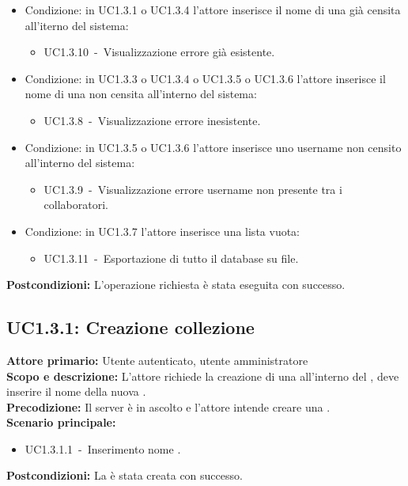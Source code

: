 \documentclass{scalatekids-article}
\begin{document}
\begin{itemize}
\item Condizione: in UC1.3.1 o UC1.3.4 l'attore inserisce il nome di una  già censita all'iterno del sistema:
  \begin{itemize}
  \item UC1.3.10\ -\ Visualizzazione errore  già esistente.
  \end{itemize}
\item Condizione: in UC1.3.3 o UC1.3.4 o UC1.3.5 o UC1.3.6 l'attore inserisce il nome di una  non censita all'interno del sistema:
  \begin{itemize}
  \item UC1.3.8\ -\ Visualizzazione errore  inesistente.
  \end{itemize}
\item Condizione: in UC1.3.5 o UC1.3.6 l'attore inserisce uno username non censito all'interno del sistema:
  \begin{itemize}
  \item UC1.3.9\ -\ Visualizzazione errore username non presente tra i collaboratori.
  \end{itemize}
\item Condizione: in UC1.3.7 l'attore inserisce una lista  vuota:
  \begin{itemize}
  \item UC1.3.11\ -\ Esportazione di tutto il database su file.
  \end{itemize}
\end{itemize}
\textbf{Postcondizioni:} L'operazione richiesta è stata eseguita con successo.

\subsection{UC1.3.1: Creazione collezione}

\textbf{Attore primario:} Utente autenticato, utente amministratore\\
\textbf{Scopo e descrizione:} L'attore richiede la creazione di una  all'interno del , deve inserire il nome della nuova .\\
\textbf{Precodizione:} Il server è in ascolto e l'attore intende creare una .\\
\textbf{Scenario principale:}
\begin{itemize}
\item UC1.3.1.1\ -\ Inserimento nome . %
\end{itemize}
\textbf{Postcondizioni:} La  è stata creata con successo.
\end{document}
